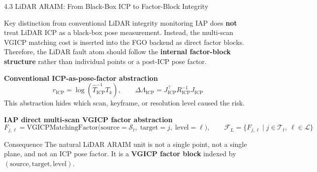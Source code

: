 \documentclass[10pt,aspectratio=169,xcolor=dvipsnames]{beamer}
\newcommand{\1}{\mathbb{1}}
\newcommand{\innov}[1]{\textcolor{NavyBlue}{\textbf{#1}}}
\begin{document}
\begin{frame}{4.3 LiDAR ARAIM: From Black-Box ICP to Factor-Block Integrity}
  \scriptsize

  \begin{alertblock}{Key distinction from conventional LiDAR integrity monitoring}
    \scriptsize
    IAP does \textbf{not} treat LiDAR ICP as a black-box pose measurement.
    Instead, the multi-scan VGICP matching cost is inserted into the FGO backend
    as direct factor blocks. Therefore, the LiDAR fault atom should follow the
    \innov{internal factor-block structure} rather than individual points or a
    post-ICP pose factor.
  \end{alertblock}

  \vspace{3pt}
  \textbf{Conventional ICP-as-pose-factor abstraction}
  \[
    r_{\mathrm{ICP}}=\log\!\left(\hat{T}_{\mathrm{ICP}}^{-1} T_k\right),
    \qquad
    \Delta\Lambda_{\mathrm{ICP}}=J_{\mathrm{ICP}}^\top R_{\mathrm{ICP}}^{-1}J_{\mathrm{ICP}}
  \]
  This abstraction hides which scan, keyframe, or resolution level caused the risk.

  \vspace{4pt}
  \textbf{IAP direct multi-scan VGICP factor abstraction}
  \[
    F_{j,\ell}=\mathrm{VGICPMatchingFactor}\bigl(
    \mathrm{source}=\mathcal{S}_t,\;\mathrm{target}=j,\;\mathrm{level}=\ell\bigr),
    \qquad
    \mathcal{F}_L=\{F_{j,\ell}\mid j\in\mathcal{T}_t,\ \ell\in\mathcal{L}\}
  \]

  \begin{block}{\small Consequence}
    \scriptsize
    The natural LiDAR ARAIM unit is not a single point, not a single plane, and
    not an ICP pose factor. It is a \innov{VGICP factor block} indexed by
    \((\mathrm{source},\mathrm{target},\mathrm{level})\).
  \end{block}
\end{frame}
\end{document}
